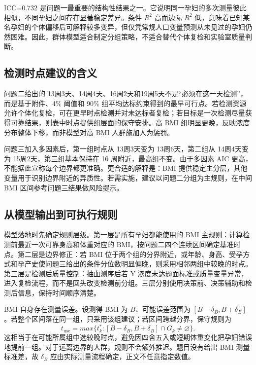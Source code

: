 \documentclass[UTF8,a4paper,12pt]{ctexart}
\begin{document}
ICC=0.732 是问题一最重要的结构性结果之一。它说明同一孕妇的多次测量彼此相似，不同孕妇之间存在显著稳定差异。条件 $R^2$ 高而边际 $R^2$ 低，意味着已知某名孕妇的个体偏移后可解释较多变异，但仅凭常规人口变量预测从未见过的孕妇仍然困难。因此，群体模型适合制定分组策略，不适合替代个体复检和实验室质量判断。

\subsection{检测时点建议的含义}

问题二给出的 13周3天、14周4天、16周2天和19周5天不是“必须在这一天检测”，而是基于附件、4\% 阈值和 90\% 组平均达标约束得到的最早可行点。若检测资源允许个体化复检，可在更早时点检测并对未达标者复检；若目标是一次检测尽量获得可靠结果，则表中时点提供组层面的保守安排。高 BMI 组明显更晚，反映浓度分布整体下移，而非模型对高 BMI 人群施加人为惩罚。

问题三加入多因素后，第一组时点从 13周3天变为 13周6天，第二组从 14周4天变为 15周2天，第三组基本保持在 16 周附近，最高组不变。由于多因素 AIC 更高，不能据此宣称每个边界都更准确。更合适的解释是：BMI 提供稳定主分层，其他变量用于识别边界附近的异质性。若需实施，建议以问题二分组为主规则，在中间 BMI 区间参考问题三结果做风险提示。

\subsection{从模型输出到可执行规则}

模型落地时先确定规则层级。第一层是所有孕妇都能使用的 BMI 主规则：计算检测前最近一次可靠身高和体重对应的 BMI，按问题二四个连续区间确定基准时点。第二层是边界修正：若 BMI 位于两个组的分界附近，或年龄、身高、受孕方式和孕产史使问题三给出的条件分位数明显偏晚，则采用相邻两组中较晚的时点。第三层是检测后质量控制：抽血测序后若 Y 浓度未达题面标准或质量变量异常，进入复检流程，而不是回头改变检测前分组。三层分别使用决策前、决策辅助和检测后信息，保持时间顺序清楚。

BMI 自身存在测量误差。设测得 BMI 为 $B$、可能误差范围为 $[B-\delta_B,B+\delta_B]$。若整个区间落在同一组，只采用该组建议；若区间跨越分界，保守规则为
\begin{equation}
t_{\mathrm{use}}=max\{t_k^*: [B-\delta_B,B+\delta_B]\cap G_k\neq\varnothing\}.
\label{eq:bmierrorrule}
\end{equation}
这相当于在可能所属组中选较晚时点，避免因四舍五入或短期体重变化把孕妇错误地提前一组。对于远离边界的人群，规则不会额外推迟。题目没有给出 BMI 测量标准差，故 $\delta_B$ 应由实际测量流程确定，正文不任意指定数值。
\end{document}
